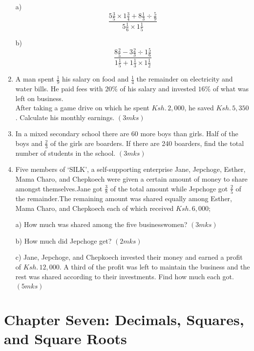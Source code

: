 \documentclass[
  a4paperpaper,
]{scrbook}
\begin{document}
\begin{tcolorbox}
\begin{enumerate}
  a)
  \[\frac{5\frac{3}{5}\times 1\frac{3}{4}+8\frac{1}{3} \div \frac{5}{9}}{5\frac{1}{6}\times 1\frac{1}{5}}\]

  b)
  \[\frac{8\frac{2}{5}-3\frac{2}{3}\div 1\frac{5}{6}}{1\frac{1}{5}+ 1\frac{1}{3}\times 1\frac{1}{2}}\]
\item
  A man spent \(\frac{1}{9}\) his salary on food and \(\frac{1}{4}\) the
  remainder on electricity and water bills. He paid fees with \(20\%\)
  of his salary and invested \(16\%\) of what was left on business.\\
  After taking a game drive on which he spent \(Ksh. \,2,000\), he saved
  \(Ksh.\,5,350\). Calculate his monthly earnings. \((3mks)\)
\item
  In a mixed secondary school there are 60 more boys than girls. Half of
  the boys and \(\frac{2}{3}\) of the girls are boarders. If there are
  240 boarders, find the total number of students in the school.
  \hspace{14.2cm} \((3mks)\)
\item
  Five members of `SILK', a self-supporting enterprise Jane, Jepchoge,
  Esther, Mama Charo, and Chepkoech were given a certain amount of money
  to share amongst themselves.Jane got \(\frac{3}{8}\) of the total
  amount while Jepchoge got \(\frac{2}{5}\) of the remainder.The
  remaining amount was shared equally among Esther, Mama Charo, and
  Chepkoech each of which received \(Ksh.\, 6,000\);

  a) How much was shared among the five businesswomen? \hspace{4.3cm}
  \((3mks)\)

  b) How much did Jepchoge get? \hspace{8.5cm} \((2mks)\)

  c) Jane, Jepchoge, and Chepkoech invested their money and earned a
  profit of \(Ksh.\, 12,000\). A third of the profit was left to
  maintain the business and the rest was shared according to their
  investments. Find how much each got.\hspace{6.5cm} \((5mks)\)
\end{enumerate}

\end{tcolorbox}


\chapter{Chapter Seven: Decimals, Squares, and Square
Roots}\label{chapter-seven-decimals-squares-and-square-roots}
\end{document}
